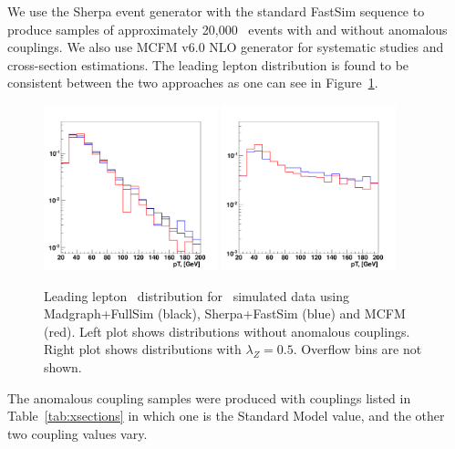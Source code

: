 We use the Sherpa event generator with the standard FastSim sequence
to produce samples of approximately 20,000 \ww\ events with and
without anomalous couplings. We also use MCFM v6.0 NLO generator for
systematic studies and cross-section estimations. The leading lepton
distribution is found to be consistent between the two approaches as
one can see in Figure~\ref{fig:generator_comparison}.
\begin{figure}[tp]
  \centerline{
    \includegraphics[width=0.45\textwidth]{figures/generator_comparison.pdf}
    \includegraphics[width=0.45\textwidth]{figures/generator_comparison_atgc.pdf}
  }

  \caption[Generator comparison]{Leading lepton \pt\ distribution
  for \WW\ simulated data using Madgraph+FullSim (black),
  Sherpa+FastSim (blue) and MCFM (red). Left plot shows distributions
  without anomalous couplings. Right plot shows distributions with
  $\lambda_{Z}=0.5$. Overflow bins are not shown.}

  \label{fig:generator_comparison}
\end{figure}

The anomalous coupling samples were produced with couplings listed in
Table~\ref{tab:xsections} in which one is the Standard Model value,
and the other two coupling values vary.

